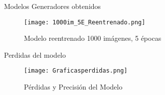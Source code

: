 \begin{frame}{Modelos Generadores obtenidos}
    
    \begin{figure}[H]
        \begin{center}
          \texttt{[image: 1000im\_5E\_Reentrenado.png]}
          \caption{Modelo reentrenado 1000 imágenes, 5 épocas}
          \label{Alexis8}
        \end{center}
    \end{figure}
     
\end{frame}

\begin{frame}{Perdidas del modelo}
    
    \begin{figure}[H]
        \begin{center}
          \texttt{[image: Graficasperdidas.png]}
          \caption{Pérdidas y Precisión del Modelo}
          \label{Alexis8}
        \end{center}
    \end{figure}
     
\end{frame}